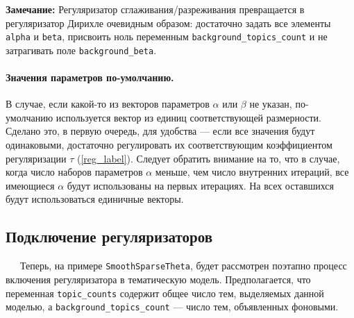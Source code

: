 {\bf Замечание:} Регуляризатор сглаживания/разреживания превращается в регуляризатор Дирихле очевидным образом: достаточно задать все элементы \verb|alpha| и \verb|beta|, присвоить ноль переменным \verb|background_topics_count| и не затрагивать поле \verb|background_beta|.

\paragraph{Значения параметров по-умолчанию.}\label{note}
 В случае, если какой-то из векторов параметров $\alpha$ или $\beta$ не указан, по-умолчанию используется вектор из единиц соответствующей размерности. Сделано это, в первую очередь, для удобства --- если все значения будут одинаковыми, достаточно регулировать их соответствующим коэффициентом регуляризации $\tau$ (\ref{reg_label}). Следует обратить внимание на то, что в случае, когда число наборов параметров $\alpha$ меньше, чем число внутренних итераций, все имеющиеся $\alpha$ будут использованы на первых итерациях. На всех оставшихся будут использоваться единичные векторы.

\subsection{Подключение регуляризаторов}

$\quad\;\:$Теперь, на примере \verb|SmoothSparseTheta|, будет рассмотрен поэтапно процесс включения регуляризатора в тематическую модель. Предполагается, что переменная \verb|topic_counts| содержит общее число тем, выделяемых данной моделью, а \verb|background_topics_count| --- число тем, объявленных фоновыми.

